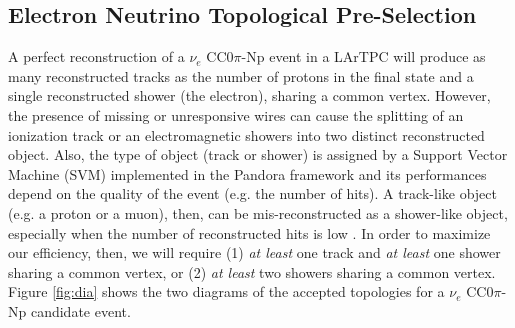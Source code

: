 \subsection{Electron Neutrino Topological Pre-Selection}\label{sec:topological_pre_selection}
A perfect reconstruction of a $\nu_{e}$ CC0$\pi$-Np event in a LArTPC will produce as many reconstructed tracks as the number of protons in the final state and a single reconstructed shower (the electron), sharing a common vertex. However, the presence of missing or unresponsive wires can cause the splitting of an ionization track or an electromagnetic showers into two distinct reconstructed object. Also, the type of object (track or shower) is assigned by a Support Vector Machine (SVM) implemented in the Pandora framework and its performances depend on the quality of the event (e.g. the number of hits). A track-like object (e.g. a proton or a muon), then, can be mis-reconstructed as a shower-like object, especially when the number of reconstructed hits is low \cite{pandora2}. In order to maximize our efficiency, then, we will require (1) \emph{at least} one track and \emph{at least} one shower sharing a common vertex, or (2) \emph{at least} two showers sharing a common vertex. Figure \ref{fig:dia} shows the two diagrams of the accepted topologies for a $\nu_{e}$ CC0$\pi$-Np candidate event.

